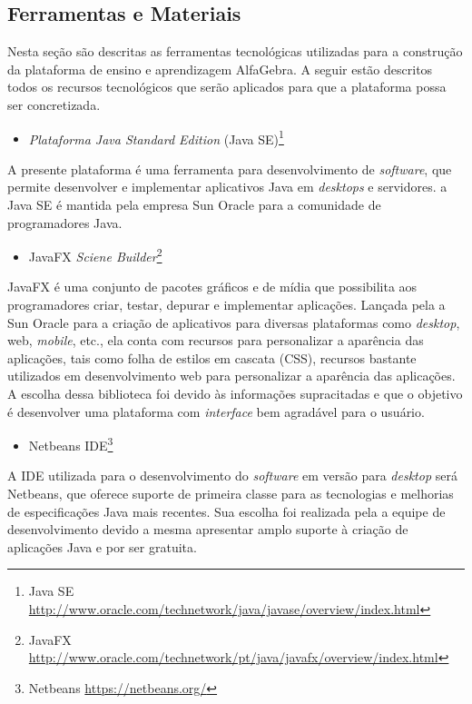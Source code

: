 \subsection{Ferramentas e Materiais}
\noindent Nesta seção são descritas as ferramentas tecnológicas utilizadas para a construção da plataforma de ensino e aprendizagem AlfaGebra. A seguir estão descritos todos os recursos tecnológicos que serão aplicados para que a plataforma possa ser concretizada.

\begin{itemize}
    \item \textit{Plataforma Java Standard Edition} (Java SE)\footnote[12]{Java SE \url{http://www.oracle.com/technetwork/java/javase/overview/index.html}}
\end{itemize}
\noindent A presente plataforma é uma ferramenta para desenvolvimento de \textit{software}, que permite desenvolver e implementar aplicativos Java em \textit{desktops} e servidores. a Java SE é mantida pela empresa Sun Oracle para a comunidade de programadores Java.

\begin{itemize}
    \item JavaFX \textit{Sciene Builder}\footnote[13]{JavaFX \url{http://www.oracle.com/technetwork/pt/java/javafx/overview/index.html}}
\end{itemize}
\noindent JavaFX é uma conjunto de pacotes gráficos e de mídia que possibilita aos programadores criar, testar, depurar e implementar aplicações. Lançada pela a Sun Oracle para a criação de aplicativos para diversas plataformas como \textit{desktop}, web, \textit{mobile}, etc., ela conta com recursos para personalizar a aparência das aplicações, tais como folha de estilos em cascata (CSS), recursos bastante utilizados em desenvolvimento web para personalizar a aparência das aplicações. A escolha dessa biblioteca foi devido às informações supracitadas e que o objetivo é desenvolver uma plataforma com \textit{interface} bem agradável para o usuário.

\begin{itemize}
    \item Netbeans IDE\footnote[14]{Netbeans \url{https://netbeans.org/}}
\end{itemize}
A IDE utilizada para o desenvolvimento do \textit{software} em versão para \textit{desktop} será Netbeans, que oferece suporte de primeira classe para as tecnologias e melhorias de especificações Java mais recentes. Sua escolha foi realizada pela a equipe de desenvolvimento devido a mesma apresentar amplo suporte à criação de aplicações Java e por ser gratuita.

